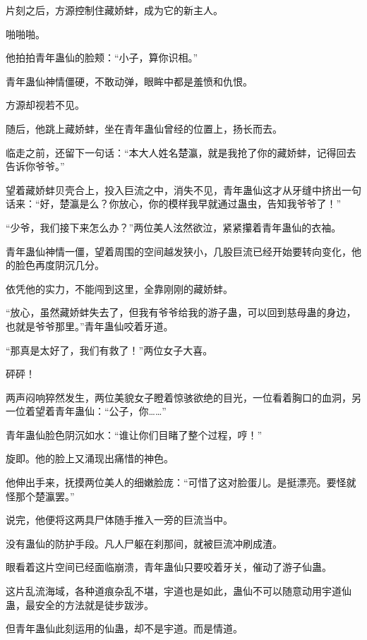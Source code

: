 
\begin{this_body}



片刻之后，方源控制住藏娇蚌，成为它的新主人。

啪啪啪。

他拍拍青年蛊仙的脸颊：“小子，算你识相。”

青年蛊仙神情僵硬，不敢动弹，眼眸中都是羞愤和仇恨。

方源却视若不见。

随后，他跳上藏娇蚌，坐在青年蛊仙曾经的位置上，扬长而去。

临走之前，还留下一句话：“本大人姓名楚瀛，就是我抢了你的藏娇蚌，记得回去告诉你爷爷。”

望着藏娇蚌贝壳合上，投入巨流之中，消失不见，青年蛊仙这才从牙缝中挤出一句话来：“好，楚瀛是么？你放心，你的模样我早就通过蛊虫，告知我爷爷了！”

“少爷，我们接下来怎么办？”两位美人泫然欲泣，紧紧攥着青年蛊仙的衣袖。

青年蛊仙神情一僵，望着周围的空间越发狭小，几股巨流已经开始要转向变化，他的脸色再度阴沉几分。

依凭他的实力，不能闯到这里，全靠刚刚的藏娇蚌。

“放心，虽然藏娇蚌失去了，但我有爷爷给我的游子蛊，可以回到慈母蛊的身边，也就是爷爷那里。”青年蛊仙咬着牙道。

“那真是太好了，我们有救了！”两位女子大喜。

砰砰！

两声闷响猝然发生，两位美貌女子瞪着惊骇欲绝的目光，一位看着胸口的血洞，另一位着望着青年蛊仙：“公子，你……”

青年蛊仙脸色阴沉如水：“谁让你们目睹了整个过程，哼！”

旋即。他的脸上又涌现出痛惜的神色。

他伸出手来，抚摸两位美人的细嫩脸庞：“可惜了这对脸蛋儿。是挺漂亮。要怪就怪那个楚瀛罢。”

说完，他便将这两具尸体随手推入一旁的巨流当中。

没有蛊仙的防护手段。凡人尸躯在刹那间，就被巨流冲刷成渣。

眼看着这片空间已经面临崩溃，青年蛊仙只要咬着牙关，催动了游子仙蛊。

这片乱流海域，各种道痕杂乱不堪，宇道也是如此，蛊仙不可以随意动用宇道仙蛊，最安全的方法就是徒步跋涉。

但青年蛊仙此刻运用的仙蛊，却不是宇道。而是情道。


\end{this_body}

